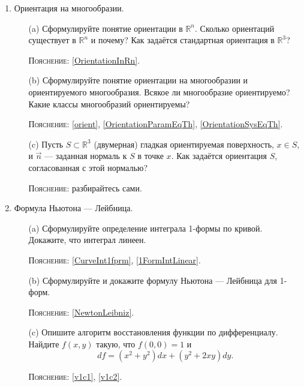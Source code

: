 \documentclass[a5paper]{article}
\theoremstyle{plain}
\theoremstyle{definition}
\numberwithin{through}{section}
\numberwithin{equation}{section}
\begin{document}
\begin{enumerate}
	\item 
	Ориентация на многообразии.
	
	\begin{itemize}
		\item[(a)]
		Сформулируйте понятие ориентации в $\mathbb{R}^n$. Сколько ориентаций
		существует в $\mathbb{R}^n$ и почему? Как задаётся стандартная ориентация в $\mathbb{R}^3$?
		
		\textsc{Пояснение:} \ref{OrientationInRn}.
		
		\item[(b)]
		Сформулируйте понятие ориентации на многообразии и ориентируемого многообразия. Всякое ли многообразие ориентируемо? Какие классы многообразий ориентируемы?
		
		\textsc{Пояснение:} \ref{orient}, \ref{OrientationParamEqTh}, \ref{OrientationSysEqTh}.
		
		
		\item[(c)]
		Пусть $S \subset \mathbb{R}^3$ (двумерная) гладкая ориентируемая поверхность,
		$x \in S$, и $\vec{n}$ --- заданная нормаль к $S$ в точке $x$. Как задаётся ориентация $S$, согласованная с этой нормалью?
		
		\textsc{Пояснение:} разбирайтесь сами.
		
		
	\end{itemize}
	
	\item
	Формула Ньютона — Лейбница.
	
	\begin{itemize}
		\item[(a)]
		Сформулируйте определение интеграла 1-формы по кривой.
		Докажите, что интеграл линеен.
		
		\textsc{Пояснение:} \ref{CurveInt1fprm}, \ref{1FormIntLinear}.
		
		\item[(b)]
		Сформулируйте и докажите формулу Ньютона --- Лейбница для
		1-форм.
			
		\textsc{Пояснение:} \ref{NewtonLeibniz}.
		
		\item[(c)]
		Опишите алгоритм восстановления функции по дифференциалу. Найдите $f(x, y)$ такую, что $f(0, 0) = 1$
		и 
		\[ df = (x^2 + y^2)dx + (y^2 + 2xy)dy. \]
		
		\textsc{Пояснение:} \ref{v1c1}, \ref{v1c2}.	
		
	\end{itemize}
\end{enumerate}
\end{document}
